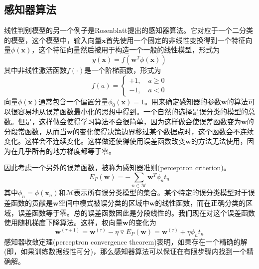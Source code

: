 \subsection*{感知器算法}
线性判别模型的另一个例子是Rosenblatt提出的感知器算法。它对应于一个二分类的模型，这个模型中，输入向量$\boldsymbol{x}$首先使用一个固定的非线性变换得到一个特征向量$\phi(\boldsymbol{x})$，这个特征向量然后被用于构造一个一般的线性模型，形式为
\begin{equation}
	y(\boldsymbol{x})=f(\boldsymbol{w}^T\phi(\boldsymbol{x}))
\end{equation}
其中非线性激活函数$f(\cdot)$是一个阶梯函数，形式为
\begin{equation}
	f(a)=\begin{cases}
		+1,\quad a\geqslant 0\\
		-1,\quad a<0
	\end{cases}
\end{equation}
向量$\phi(\boldsymbol{x})$通常包含一个偏置分量$\phi_0(\boldsymbol{x})=1$。用来确定感知器的参数$\boldsymbol{w}$的算法可以很容易地从误差函数最小化的思想中得到。一个自然的选择是误分类的模型的总数。但是，这样做会使得学习算法不会很简单，因为这样做会使误差函数变为$\boldsymbol{w}$的分段常函数，从而当$\boldsymbol{w}$的变化使得决策边界移过某个数据点时，这个函数会不连续变化。这样会不连续变化。这样做还使得使用误差函数改变$\boldsymbol{w}$的方法无法使用，因为在几乎所有的地方梯度都等于零。

因此考虑一个另外的误差函数，被称为感知器准则(perceptron criterion)。
\begin{equation}
	E_P(\boldsymbol{w})=-\sum_{n\in \mathcal{M}}\boldsymbol{w}^T\phi_nt_n
\end{equation}
其中$\phi_n=\phi(\boldsymbol{x}_n)$和$\mathcal{M}$表示所有误分类模型的集合。某个特定的误分类模型对于误差函数的贡献是$\boldsymbol{w}$空间中模式被误分类的区域中$\boldsymbol{w}$的线性函数，而在正确分类的区域，误差函数等于零。总的误差函数因此是分段线性的。我们现在对这个误差函数使用随机梯度下降算法。这样，权向量$\boldsymbol{w}$的变化为
\begin{equation}
	\boldsymbol{w}^{(\tau+1)}=\boldsymbol{w}^{(\tau)}-\eta \triangledown E_P(\boldsymbol{w})=\boldsymbol{w}^{(\tau)}+\eta\phi_nt_n
\end{equation}
感知器收敛定理(perceptron convergence theorem)表明，如果存在一个精确的解(即，如果训练数据线性可分)，那么感知器算法可以保证在有限步骤内找到一个精确解。

